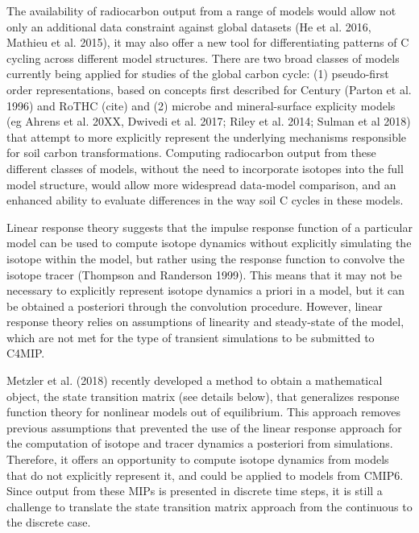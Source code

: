 \documentclass[11pt,a4paper]{article}
\begin{document}
The availability of radiocarbon output from a range of models would allow not only an additional data constraint against global datasets (He et al. 2016, Mathieu et al. 2015), it may also offer a new tool for differentiating patterns of C cycling across different model structures. There are two broad classes of models currently being applied for studies of the global carbon cycle: (1) pseudo-first order representations, based on concepts first described for Century (Parton et al. 1996) and RoTHC (cite) and (2) microbe and mineral-surface explicity models (eg Ahrens et al. 20XX, Dwivedi et al. 2017; Riley et al. 2014; Sulman et al 2018) that attempt to more explicitly represent the underlying mechanisms responsible for soil carbon transformations. Computing radiocarbon output from these different classes of models, without the need to incorporate isotopes into the full model structure, would allow more widespread data-model comparison, and an enhanced ability to evaluate differences in the way soil C cycles in these models.

Linear response theory suggests that the impulse response function of a particular model can be used to compute isotope dynamics without explicitly simulating the isotope within the model, but rather using the response function to convolve the isotope tracer (Thompson and Randerson 1999). This means that it may not be necessary to explicitly represent isotope dynamics a priori in a model, but it can be obtained a posteriori through the convolution procedure. However, linear response theory relies on assumptions of linearity and steady-state of the model, which are not met for the type of transient simulations to be submitted to C4MIP. 

Metzler et al. (2018) recently developed a method to obtain a mathematical object, the state transition matrix (see details below), that generalizes response function theory for nonlinear models out of equilibrium. This approach removes previous assumptions that prevented the use of the linear response approach for the computation of isotope and tracer dynamics a posteriori from simulations. Therefore, it offers an opportunity to compute isotope dynamics from models that do not explicitly represent it, and could be applied to models from CMIP6. Since output from these MIPs is presented in discrete time steps, it is still a challenge to translate the state transition matrix approach from the continuous to the discrete case.
\end{document}

